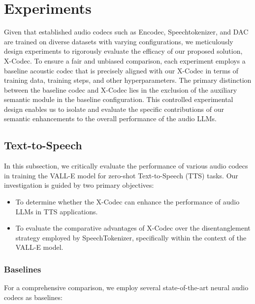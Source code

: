 \section{Experiments}

Given that established audio codecs such as Encodec, Speechtokenizer, and DAC are trained on diverse datasets with varying configurations, we meticulously design experiments to rigorously evaluate the efficacy of our proposed solution, X-Codec. To ensure a fair and unbiased comparison, each experiment employs a baseline acoustic codec that is precisely aligned with our X-Codec in terms of training data, training steps, and other hyperparameters. The primary distinction between the baseline codec and X-Codec lies in the exclusion of the auxiliary semantic module in the baseline configuration. This controlled experimental design enables us to isolate and evaluate the specific contributions of our semantic enhancements to the overall performance of the audio LLMs.


 
\subsection{Text-to-Speech}

In this subsection, we critically evaluate the performance of various audio codecs in training the VALL-E model for zero-shot Text-to-Speech (TTS) tasks. Our investigation is guided by two primary objectives:
\begin{itemize}
\item To determine whether the X-Codec can enhance the performance of audio LLMs in TTS applications.
\item To evaluate the comparative advantages of X-Codec over the disentanglement strategy employed by SpeechTokenizer, specifically within the context of the VALL-E model.
\end{itemize}

\subsubsection{Baselines}

For a comprehensive comparison, we employ several state-of-the-art neural audio codecs as baselines:

